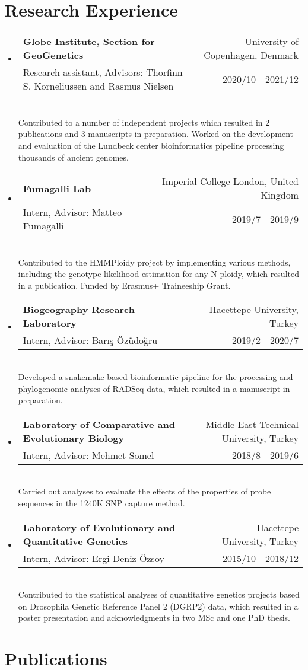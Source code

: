 \documentclass[letterpaper,10.5pt]{article}
\makeatletter
\newcommand{\resumeSubheading}[5]{
  \vspace{-1pt}\item
    \begin{tabular*}{0.97\textwidth}{l@{\extracolsep{\fill}}r}
      \textbf{#1} & #2 \\
      {\small#3} & {\small #4} \\
    \end{tabular*}\vspace{3pt} \\
    #5
}
\newcommand{\resumeSubHeadingListStart}{\begin{itemize}[leftmargin=*]}
\newcommand{\resumeSubHeadingListEnd}{\end{itemize}}
\makeatother
\begin{document}
\section{Research Experience}
  \resumeSubHeadingListStart

    \resumeSubheading
      {Globe Institute, Section for GeoGenetics}{University of Copenhagen, Denmark}
      {Research assistant, Advisors: Thorfinn S. Korneliussen and Rasmus Nielsen}{2020/10 - 2021/12}
      {Contributed to a number of independent projects which resulted in 2 publications and 3 manuscripts in preparation. Worked on the development and evaluation of the Lundbeck center bioinformatics pipeline processing thousands of ancient genomes. }
    \medskip
    
    
    \resumeSubheading
      {Fumagalli Lab}{Imperial College London, United Kingdom}
      {Intern, Advisor: Matteo Fumagalli}{2019/7 - 2019/9}
      {Contributed to the HMMPloidy project by implementing various methods, including the genotype likelihood estimation for any N-ploidy, which resulted in a publication. Funded by Erasmus+ Traineeship Grant.}
    \medskip


    \resumeSubheading
      {Biogeography Research Laboratory}{Hacettepe University, Turkey}
      {Intern, Advisor: Bar{\i}\c{s} \"{O}z\"{u}do\u{g}ru}{2019/2 - 2020/7}
      {Developed a snakemake-based bioinformatic pipeline for the processing and phylogenomic analyses of RADSeq data, which resulted in a manuscript in preparation.}
    \medskip
 
    \resumeSubheading
      {Laboratory of Comparative and Evolutionary Biology}{Middle East Technical University, Turkey}
      {Intern, Advisor: Mehmet Somel}{2018/8 - 2019/6}
      {Carried out analyses to evaluate the effects of the properties of probe sequences in the 1240K SNP capture method.}

    \medskip


    \resumeSubheading
      {Laboratory of Evolutionary and Quantitative Genetics}{Hacettepe University, Turkey}
      {Intern, Advisor: Ergi Deniz \"{O}zsoy}{2015/10 - 2018/12}
      {Contributed to the statistical analyses of quantitative genetics projects based on Drosophila Genetic Reference Panel 2 (DGRP2) data, which resulted in a poster presentation and acknowledgments in two MSc and one PhD thesis.}
  \resumeSubHeadingListEnd
  


\section{Publications}
\end{document}
